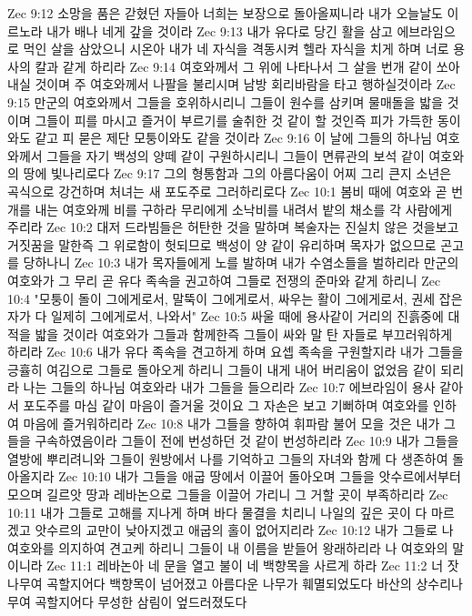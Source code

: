 Zec 9:12  소망을 품은 갇혔던 자들아 너희는 보장으로 돌아올찌니라 내가 오늘날도 이르노라 내가 배나 네게 갚을 것이라
Zec 9:13  내가 유다로 당긴 활을 삼고 에브라임으로 먹인 살을 삼았으니 시온아 내가 네 자식을 격동시켜 헬라 자식을 치게 하며 너로 용사의 칼과 같게 하리라
Zec 9:14  여호와께서 그 위에 나타나서 그 살을 번개 같이 쏘아내실 것이며 주 여호와께서 나팔을 불리시며 남방 회리바람을 타고 행하실것이라
Zec 9:15  만군의 여호와께서 그들을 호위하시리니 그들이 원수를 삼키며 물매돌을 밟을 것이며 그들이 피를 마시고 즐거이 부르기를 술취한 것 같이 할 것인즉 피가 가득한 동이와도 같고 피 묻은 제단 모퉁이와도 같을 것이라
Zec 9:16  이 날에 그들의 하나님 여호와께서 그들을 자기 백성의 양떼 같이 구원하시리니 그들이 면류관의 보석 같이 여호와의 땅에 빛나리로다
Zec 9:17  그의 형통함과 그의 아름다움이 어찌 그리 큰지 소년은 곡식으로 강건하며 처녀는 새 포도주로 그러하리로다
Zec 10:1  봄비 때에 여호와 곧 번개를 내는 여호와께 비를 구하라 무리에게 소낙비를 내려서 밭의 채소를 각 사람에게 주리라
Zec 10:2  대저 드라빔들은 허탄한 것을 말하며 복술자는 진실치 않은 것을보고 거짓꿈을 말한즉 그 위로함이 헛되므로 백성이 양 같이 유리하며 목자가 없으므로 곤고를 당하나니
Zec 10:3  내가 목자들에게 노를 발하며 내가 수염소들을 벌하리라 만군의 여호와가 그 무리 곧 유다 족속을 권고하여 그들로 전쟁의 준마와 같게 하리니
Zec 10:4  "모퉁이 돌이 그에게로서, 말뚝이 그에게로서, 싸우는 활이 그에게로서, 권세 잡은 자가 다 일제히 그에게로서, 나와서"
Zec 10:5  싸울 때에 용사같이 거리의 진흙중에 대적을 밟을 것이라 여호와가 그들과 함께한즉 그들이 싸와 말 탄 자들로 부끄러워하게 하리라
Zec 10:6  내가 유다 족속을 견고하게 하며 요셉 족속을 구원할지라 내가 그들을 긍휼히 여김으로 그들로 돌아오게 하리니 그들이 내게 내어 버리움이 없었음 같이 되리라 나는 그들의 하나님 여호와라 내가 그들을 들으리라
Zec 10:7  에브라임이 용사 같아서 포도주를 마심 같이 마음이 즐거울 것이요 그 자손은 보고 기뻐하며 여호와를 인하여 마음에 즐거워하리라
Zec 10:8  내가 그들을 향하여 휘파람 불어 모을 것은 내가 그들을 구속하였음이라 그들이 전에 번성하던 것 같이 번성하리라
Zec 10:9  내가 그들을 열방에 뿌리려니와 그들이 원방에서 나를 기억하고 그들의 자녀와 함께 다 생존하여 돌아올지라
Zec 10:10  내가 그들을 애굽 땅에서 이끌어 돌아오며 그들을 앗수르에서부터 모으며 길르앗 땅과 레바논으로 그들을 이끌어 가리니 그 거할 곳이 부족하리라
Zec 10:11  내가 그들로 고해를 지나게 하며 바다 물결을 치리니 나일의 깊은 곳이 다 마르겠고 앗수르의 교만이 낮아지겠고 애굽의 홀이 없어지리라
Zec 10:12  내가 그들로 나 여호와를 의지하여 견고케 하리니 그들이 내 이름을 받들어 왕래하리라 나 여호와의 말이니라
Zec 11:1  레바논아 네 문을 열고 불이 네 백향목을 사르게 하라
Zec 11:2  너 잣나무여 곡할지어다 백향목이 넘어졌고 아름다운 나무가 훼멸되었도다 바산의 상수리나무여 곡할지어다 무성한 삼림이 엎드러졌도다
